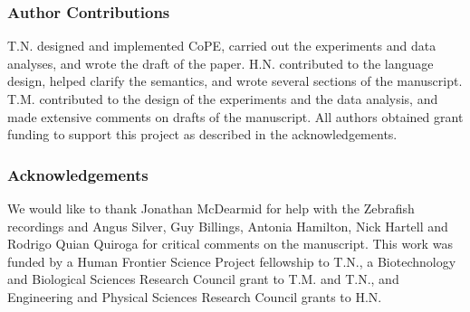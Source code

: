 \subsubsection*{Author Contributions}  

T.N. designed and implemented CoPE, carried out the experiments and
data analyses, and wrote the draft of the paper. H.N. contributed to
the language design, helped clarify the semantics, and wrote several
sections of the manuscript. T.M. contributed to the design of the
experiments and the data analysis, and made extensive comments on
drafts of the manuscript. All authors obtained grant funding to
support this project as described in the acknowledgements.

\subsubsection*{Acknowledgements}  

We would like to thank Jonathan McDearmid for help with the Zebrafish
recordings and Angus Silver, Guy Billings, Antonia Hamilton, Nick
Hartell and Rodrigo Quian Quiroga for critical comments on the
manuscript. This work was funded by a Human Frontier Science Project
fellowship to T.N., a Biotechnology and Biological Sciences Research
Council grant to T.M. and T.N., and Engineering and Physical Sciences Research
Council grants to H.N.



